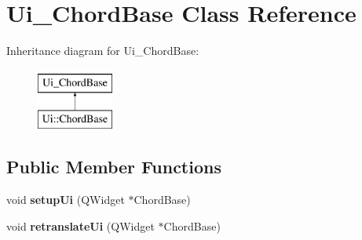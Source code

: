 \hypertarget{class_ui___chord_base}{}\section{Ui\+\_\+\+Chord\+Base Class Reference}
\label{class_ui___chord_base}
Inheritance diagram for Ui\+\_\+\+Chord\+Base\+:\begin{figure}[H]
\begin{center}
\leavevmode
\includegraphics[height=2.000000cm]{class_ui___chord_base}
\end{center}
\end{figure}
\subsection*{Public Member Functions}
\begin{DoxyCompactItemize}
\item 
\mbox{\label{class_ui___chord_base_ad01a21dba21804fbe24f74c522855671}} 
void {\bfseries setup\+Ui} (Q\+Widget $\ast$Chord\+Base)
\item 
\mbox{\label{class_ui___chord_base_ac2978cc8e0ff4a923bed95b92658a303}} 
void {\bfseries retranslate\+Ui} (Q\+Widget $\ast$Chord\+Base)
\end{DoxyCompactItemize}
